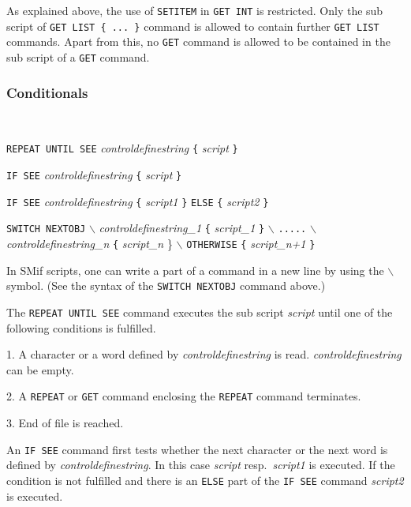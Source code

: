 \documentclass{article}
\begin{document}
As explained above, the use of \texttt{SETITEM} in \texttt{GET INT} is
restricted. Only the sub script of \texttt{GET LIST \{ ... \}} command
is allowed to contain further \texttt{GET LIST} commands. Apart from
this, no \texttt{GET} command is allowed to be contained in the sub
script of a \texttt{GET} command.

\subsubsection{Conditionals}

{~}

\texttt{REPEAT UNTIL SEE} \emph{controldefinestring} \texttt{\{}
\emph{script} \texttt{\}}

\texttt{IF SEE} \emph{controldefinestring} \texttt{\{} \emph{script}
\texttt{\}}

\texttt{IF SEE} \emph{controldefinestring} \texttt{\{} \emph{script1}
\texttt{\}} \texttt{ELSE} \texttt{\{} \emph{script2} \texttt{\}}

\texttt{SWITCH NEXTOBJ} \texttt{$\backslash$} \newline \hspace*{64pt}
\emph{controldefinestring\_1} \texttt{\{} \emph{script\_1} \texttt{\}}
\texttt{$\backslash$} \newline \hspace*{64pt} \texttt{.....}
\texttt{$\backslash$} \newline \hspace*{64pt}
\emph{controldefinestring\_n} \texttt{\{} \emph{script\_n} \textrm{\}}
\texttt{$\backslash$} \newline \hspace*{64pt} \texttt{OTHERWISE}
\texttt{\{} \emph{script\_n+1} \texttt{\}}

In SMif scripts, one can write a part of a command in a new line by
using the $\backslash$ symbol. (See the syntax of the \texttt{SWITCH
  NEXTOBJ} command above.)

The \texttt{REPEAT UNTIL SEE} command executes the sub script
\emph{script} until one of the following conditions is fulfilled.

1. A character or a word defined by \emph{controldefinestring} is
read.  \emph{controldefinestring} can be empty.

2. A \texttt{REPEAT} or \texttt{GET} command enclosing the
\texttt{REPEAT} command terminates.

3. End of file is reached.

An \texttt{IF SEE} command first tests whether the next character or
the next word is defined by \emph{controldefinestring}. In this case
\emph{script} resp.\ \emph{script1} is executed. If the condition is
not fulfilled and there is an \texttt{ELSE} part of the \texttt{IF
  SEE} command \emph{script2} is executed.
\end{document}
